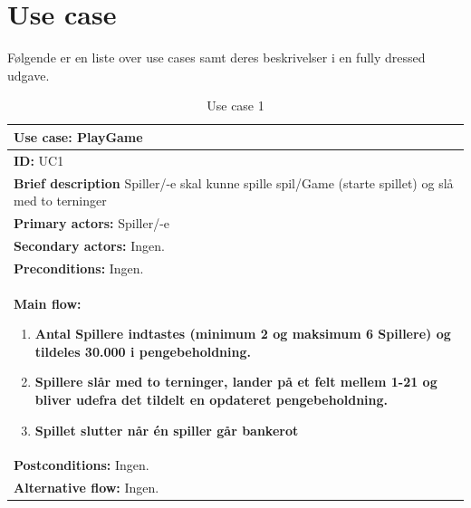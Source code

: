 \newpage

\section{Use case}

Følgende er en liste over use cases samt deres beskrivelser i en fully dressed udgave.


\begin{table}[H]
    \begin{center}
        \begin{tabular}{ | p{15cm} |}
            \hline
            \textbf{Use case:} PlayGame \\ \hline
            \textbf{ID:} UC1 \\ \hline
            \textbf{Brief description} Spiller/-e skal kunne spille spil/Game (starte spillet) og slå med to terninger     \\ \hline
            \textbf{Primary actors:} Spiller/-e \\ \hline
            \textbf{Secondary actors:} Ingen. \\ \hline
            \textbf{Preconditions:} Ingen.     \\ \hline
            \textbf{Main flow:}
            \begin{enumerate}
                \item \textbf{Antal Spillere indtastes (minimum 2 og maksimum 6 Spillere) og tildeles 30.000 i pengebeholdning.}
                \item \textbf{Spillere slår med to terninger, lander på et felt mellem 1-21 og bliver udefra det tildelt en opdateret pengebeholdning.}
                \item \textbf{Spillet slutter når én spiller går bankerot}
            \end{enumerate} \\ \hline
            \textbf{Postconditions:} Ingen.\\ \hline
            \textbf{Alternative flow:} Ingen.\\ \hline
            \hline
        \end{tabular}
        \caption{Use case 1}
        \label{usecase:1}
    \end{center}
\end{table}

